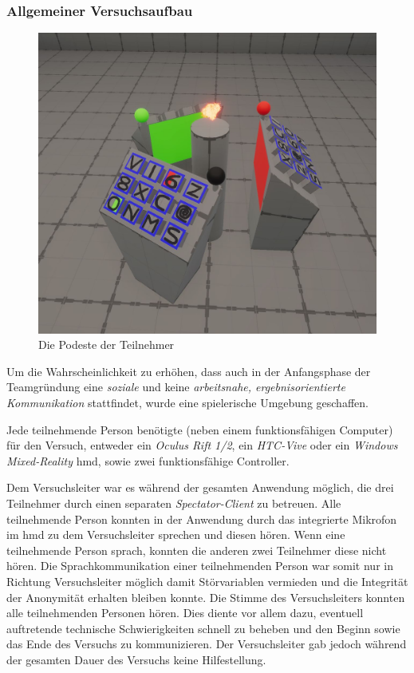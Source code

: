 \documentclass[a4paper,11pt]{article}%
\renewcommand{\\}{\vspace*{0.5\baselineskip} \newline}
\begin{document}
	\subsubsection{Allgemeiner Versuchsaufbau}

\begin{figure}[h]
		\begin{footnotesize}
			\includegraphics[width=\textwidth]{Abbildungen/Podeste.JPG}	
			\caption[Die Podeste der Teilnehmer]{Die Podeste der Teilnehmer}
			\label{Podeste}
		\end{footnotesize}
	\end{figure}

Um die Wahrscheinlichkeit zu erhöhen, dass auch in der Anfangsphase der Teamgründung eine \textit{soziale} und keine \textit{arbeitsnahe, ergebnisorientierte Kommunikation} stattfindet, wurde eine spielerische Umgebung geschaffen.

Jede teilnehmende Person benötigte (neben einem funktionsfähigen Computer) für den Versuch, entweder ein \textit{Oculus Rift 1/2}, ein \textit{HTC-Vive} oder ein \textit{Windows Mixed-Reality} \ac{hmd}, sowie zwei funktionsfähige Controller.

Dem Versuchsleiter war es während der gesamten Anwendung möglich, die drei Teilnehmer durch einen separaten \textit{Spectator-Client} zu betreuen. Alle teilnehmende Person konnten in der Anwendung durch das integrierte Mikrofon im \ac{hmd} zu dem Versuchsleiter sprechen und diesen hören. Wenn eine teilnehmende Person sprach, konnten die anderen zwei Teilnehmer diese nicht hören. Die Sprachkommunikation einer teilnehmenden Person war somit nur in Richtung Versuchsleiter möglich damit Störvariablen vermieden und die Integrität der Anonymität erhalten bleiben konnte.
Die Stimme des Versuchsleiters konnten alle teilnehmenden Personen hören. Dies diente vor allem dazu, eventuell auftretende technische Schwierigkeiten schnell zu beheben und den Beginn sowie das Ende des Versuchs zu kommunizieren. Der Versuchsleiter gab jedoch während der gesamten Dauer des Versuchs keine Hilfestellung.
\end{document}
